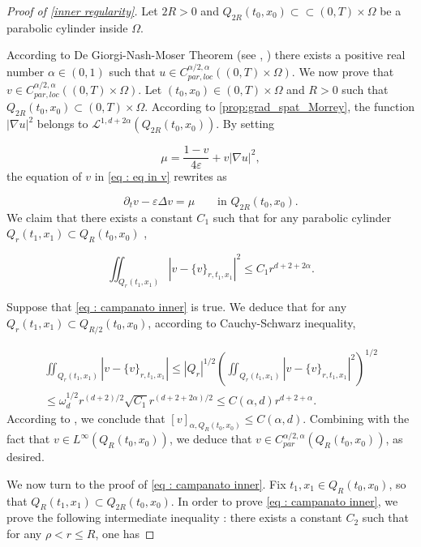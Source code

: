 \documentclass[reqno,12pt,twoside]{amsart}
\numberwithin{equation}{section} \numberwithin{theorem}{section}
\numberwithin{proposition}{section} \numberwithin{lemma}{section}
\numberwithin{corollary}{section}
\numberwithin{definition}{section} \numberwithin{remark}{section}
\begin{document}
\begin{proof}[Proof of \autoref{inner regularity}]
Let $2R > 0$ and $Q_{2R}(t_0, x_0) \subset \subset (0,T) \times \Omega$ be a parabolic cylinder inside $\Omega$.

\smallskip

According to De Giorgi-Nash-Moser Theorem (see \cite[Theorem 3.2.3]{I26}, \cite[Section IV, Theorem 1.2]{DB93})
there exists a positive real number $\alpha \in (0,1)$ such that $u \in C_{par, loc}^{\alpha/2, \alpha}((0,T) \times \Omega)$. We now prove that $v \in C_{par, loc}^{\alpha/2, \alpha}((0,T) \times \Omega)$. 
Let $(t_0,x_0) \in (0,T) \times \Omega$ and $R >0$ such that $Q_{2R}(t_0,x_0) \subset (0,T)\times \Omega$. According to \autoref{prop:grad_spat_Morrey}, the function $|\nabla u|^2$ belongs to $\mathcal{L}^{1,d+2\alpha}(Q_{2R}(t_0,x_0))$. By setting 

\[\mu = \frac{1-v}{4\varepsilon} + v |\nabla u|^2,\]
the equation of $v$ in \eqref{eq : eq in v} rewrites as 

\[\partial_t v - \varepsilon \Delta v = \mu \quad \quad \text{in } Q_{2R}(t_0,x_0).\]
We claim that there exists a constant $C_1$ such that for any parabolic cylinder $Q_r(t_1,x_1) \subset Q_{R}(t_0,x_0)$ , 

\begin{equation}\label{eq : campanato inner}
\iint_{Q_r(t_1, x_1)} |v - \{v\}_{r,t_1,x_1}|^2 \leqslant C_1 r^{d+2+2\alpha}.
\end{equation}

Suppose that \eqref{eq : campanato inner} is true. We deduce that for any $Q_r(t_1,x_1) \subset Q_{R/2}(t_0,x_0)$, according to Cauchy-Schwarz inequality, 

\begin{multline*}
\iint_{Q_r(t_1,x_1)} |v - \{v\}_{r,t_1,x_1}| \leqslant |Q_r|^{1/2} \left(\iint_{Q_r(t_1,x_1)}  |v - \{v\}_{r,t_1,x_1}|^2 \right)^{1/2}\\
\leqslant \omega_d ^{1/2} r^{(d+2)/2} \sqrt{C_1} r^{(d+2+2\alpha)/2} \leqslant C(\alpha, d) r^{d+2+\alpha}.
\end{multline*}
According to \cite[Lemma 4.3]{L96}, we conclude that $[v]_{\alpha, Q_R(t_0,x_0)} \leqslant C(\alpha, d)$. Combining with the fact that $v\in L^\infty(Q_R(t_0,x_0))$, we deduce that $v\in C_{par}^{\alpha/2, \alpha}(Q_R(t_0,x_0))$, as desired. 

\smallskip

We now turn to the proof of \eqref{eq : campanato inner}. Fix $t_1, x_1 \in Q_R(t_0,x_0)$, so that $Q_R(t_1, x_1) \subset Q_{2R}(t_0, x_0)$. In order to prove \eqref{eq : campanato inner}, we prove the following intermediate inequality : there exists a constant $C_2$ such that for any $\rho < r \leqslant R$, one has 


\end{proof}
\end{document}
